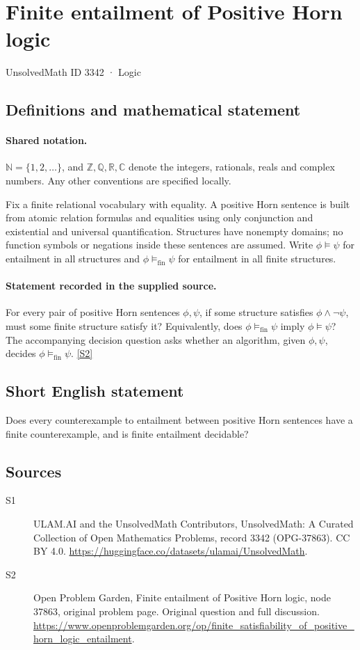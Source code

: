 \documentclass[11pt]{article}
\newcommand{\sref}[2]{\hyperlink{source:#1:#2}{[S#2]}}
\begin{document}
\setcounter{section}{3341}
\section{Finite entailment of Positive Horn logic}\label{3342}
{\small\sffamily UnsolvedMath ID 3342 · Logic}
\subsection{Definitions and mathematical statement}

\paragraph{Shared notation.}$\mathbb N=\{1,2,\ldots\}$, and $\mathbb Z,\mathbb Q,\mathbb R,\mathbb C$ denote the integers, rationals, reals and complex numbers. Any other conventions are specified locally.


Fix a finite relational vocabulary with equality. A positive Horn sentence is built from atomic relation formulas and equalities using only conjunction and existential and universal quantification. Structures have nonempty domains; no function symbols or negations inside these sentences are assumed. Write $\phi\models\psi$ for entailment in all structures and $\phi\models_{\mathrm{fin}}\psi$ for entailment in all finite structures.
\paragraph{Statement recorded in the supplied source.}
For every pair of positive Horn sentences $\phi,\psi$, if some structure satisfies $\phi\wedge\neg\psi$, must some finite structure satisfy it? Equivalently, does $\phi\models_{\mathrm{fin}}\psi$ imply $\phi\models\psi$? The accompanying decision question asks whether an algorithm, given $\phi,\psi$, decides $\phi\models_{\mathrm{fin}}\psi$. \sref{3342}{2}
\subsection{Short English statement}
Does every counterexample to entailment between positive Horn sentences have a finite counterexample, and is finite entailment decidable?
\subsection{Sources}
\begin{description}
\item[\hypertarget{source:3342:1}{S1}] ULAM.AI and the UnsolvedMath Contributors, UnsolvedMath: A Curated Collection of Open Mathematics Problems, record 3342 (OPG-37863). CC BY 4.0. \url{https://huggingface.co/datasets/ulamai/UnsolvedMath}.
\item[\hypertarget{source:3342:2}{S2}] Open Problem Garden, Finite entailment of Positive Horn logic, node 37863, original problem page. Original question and full discussion. \url{https://www.openproblemgarden.org/op/finite_satisfiability_of_positive_horn_logic_entailment}.

\end{description}
\label{end:3342}
\end{document}
